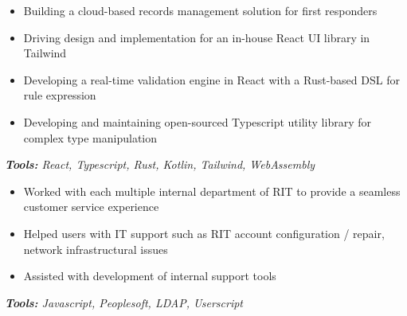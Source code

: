 \begin{itemize}
  \item Building a cloud-based records management solution for first responders
  \item Driving design and implementation for an in-house React UI library in Tailwind
  \item Developing a real-time validation engine in React with a Rust-based DSL for rule expression
  \item Developing and maintaining open-sourced Typescript utility library for complex type manipulation
\end{itemize}
\textit{\textbf{Tools:} React, Typescript, Rust, Kotlin, Tailwind, WebAssembly}

\divider

\begin{itemize}
  \item Worked with each multiple internal department of RIT to provide a seamless customer service experience
  \item Helped users with IT support such as RIT account configuration / repair, network infrastructural issues
  \item Assisted with development of internal support tools
\end{itemize}
\textit{\textbf{Tools:} Javascript, Peoplesoft, LDAP, Userscript}